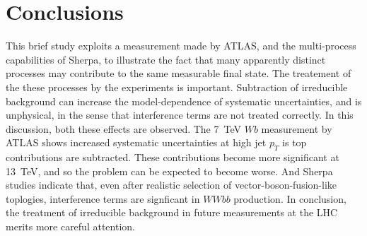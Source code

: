 \documentclass[11pt]{cernrep}
\begin{document}
\section{Conclusions}\label{sec:conclusions}

This brief study exploits a measurement made by ATLAS, and the multi-process capabilities of Sherpa, to illustrate the fact
that many apparently distinct processes may contribute to the same measurable final state. The treatement of the these processes by
the experiments is important. Subtraction of irreducible background can increase the model-dependence of systematic uncertainties, and 
is unphysical, in the sense that interference terms are not treated correctly. In this discussion, both these effects are observed.
The 7~TeV $Wb$ measurement by ATLAS shows increased systematic uncertainties at high jet $p_T$ is top contributions are subtracted. 
These contributions become more significant at 13~TeV, and so the problem can be expected to become worse. And Sherpa studies indicate
that, even after realistic selection of vector-boson-fusion-like toplogies, interference terms are signficant in $WWbb$ production. 
In conclusion, the treatment of irreducible background in future measurements at the LHC merits more careful attention.


\end{document}
